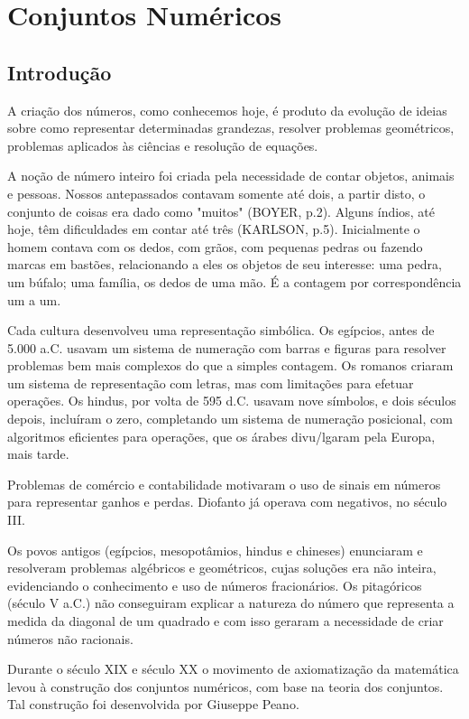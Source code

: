 \chapter{Conjuntos Numéricos}
\section{Introdução}

A criação dos números, como conhecemos hoje, é produto da evolução de ideias sobre como representar determinadas grandezas, resolver problemas geométricos, problemas aplicados às ciências e resolução de equações. 

A noção de número inteiro foi criada pela necessidade de contar objetos, animais e pessoas. Nossos antepassados contavam somente até dois, a partir disto, o conjunto de coisas era dado como "muitos" (BOYER, p.2). Alguns índios, até hoje, têm dificuldades em contar até três (KARLSON, p.5). Inicialmente o homem contava com os dedos, com grãos, com pequenas pedras ou fazendo marcas em bastões, relacionando a eles os objetos de seu interesse: uma pedra, um búfalo; uma família, os dedos de uma mão. É a contagem por correspondência um a um.

Cada cultura desenvolveu uma representação simbólica. Os egípcios, antes de 5.000 a.C. usavam um sistema de numeração com barras e figuras para resolver problemas bem mais complexos do que a simples contagem. Os romanos criaram um sistema de representação com letras, mas com limitações para efetuar operações. Os hindus, por volta de 595 d.C. usavam nove símbolos, e dois séculos depois, incluíram o zero, completando um sistema de numeração posicional, com algoritmos eficientes para operações, que os árabes divu/lgaram pela Europa, mais tarde. 

Problemas de comércio e contabilidade motivaram o uso de sinais em números para representar ganhos e perdas. Diofanto já operava com negativos, no século III. 

Os povos antigos (egípcios, mesopotâmios, hindus e chineses) enunciaram e resolveram problemas algébricos e geométricos, cujas soluções era não inteira, evidenciando o conhecimento e uso de números fracionários. Os pitagóricos (século V a.C.) não conseguiram explicar a natureza do número que representa a medida da diagonal de um quadrado e com isso geraram a necessidade de criar números não racionais. 

Durante o século XIX e século XX o movimento de axiomatização da matemática levou à construção dos conjuntos numéricos, com base na teoria dos conjuntos. Tal construção foi desenvolvida por Giuseppe Peano. 

